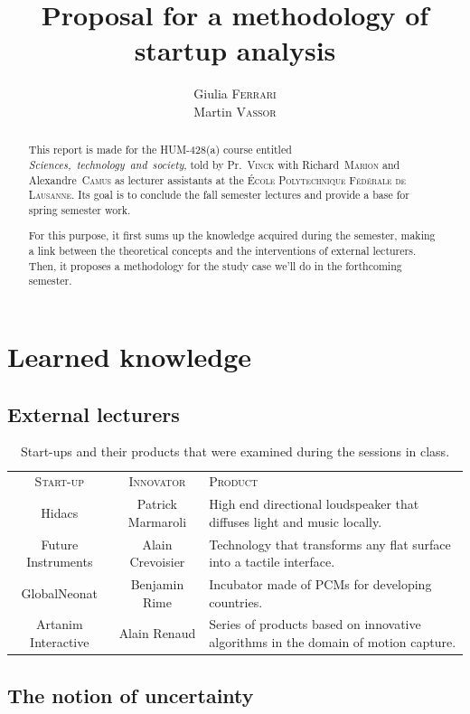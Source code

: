 \documentclass[twoside]{report}
\title{Proposal for a methodology of startup analysis}
\author{Giulia \textsc{Ferrari}\\Martin \textsc{Vassor}}
\begin{document}
\maketitle
\begin{abstract}
	\paragraph{}
	This report is made for the HUM-428(a) course entitled \emph{Sciences,~technology~and~society}, told by Pr.~\textsc{Vinck} with Richard~\textsc{Marion} and Alexandre~\textsc{Camus} as lecturer assistants at the \textsc{École Polytechnique Fédérale de Lausanne}. Its goal is to conclude the fall semester lectures and provide a base for spring semester work. 
	
	For this purpose, it first sums up the knowledge acquired during the semester, making a link between the theoretical concepts and the interventions of external lecturers. Then, it proposes a methodology for the study case we'll do in the forthcoming semester.
\end{abstract}
\tableofcontents
\listoffigures
\listoftables
\chapter{Learned knowledge}
\section{External lecturers}
\begin{table}
\begin{tabular}{ccp{5cm}}
\textsc{Start-up} & \textsc{Innovator} & \textsc{Product} \\
Hidacs & Patrick Marmaroli & High end directional loudspeaker that diffuses light and music locally. \\
Future Instruments & Alain Crevoisier & Technology that transforms any flat surface into a tactile interface. \\
GlobalNeonat & Benjamin Rime & Incubator made of PCMs  for developing countries.\\
Artanim Interactive & Alain Renaud & Series of products based on innovative algorithms in the domain of motion capture. \\
\end{tabular}
\caption{Start-ups and their products that were examined during the sessions in class.}
\label{tab:lecturers}
\end{table}
\section{The notion of uncertainty}
\end{document}
